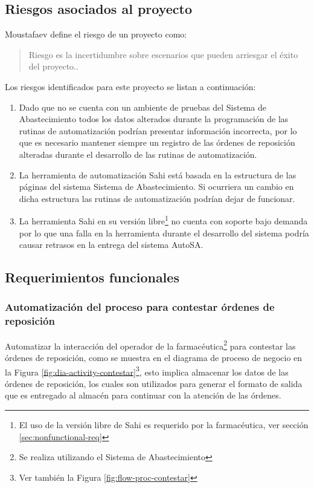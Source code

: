 \subsection{Riesgos asociados al proyecto}\label{sec-riesgos}
Moustafaev define el riesgo de un proyecto como:
\begin{quote}
Riesgo es la incertidumbre sobre escenarios que pueden arriesgar el éxito del proyecto.\cite{ScopeManagement}.
\end{quote}
Los riesgos identificados para este proyecto se listan a continuación:
\begin{enumerate}
  \item Dado que no se cuenta con un ambiente de pruebas del Sistema de Abastecimiento todos los datos alterados durante la programación de las rutinas de automatización podrían presentar información incorrecta, por lo que es necesario mantener siempre un registro de las órdenes de reposición alteradas durante el desarrollo de las rutinas de automatización.
  \item La herramienta de automatización Sahi está basada en la estructura de las páginas del sistema Sistema de Abastecimiento. Si ocurriera un cambio en dicha estructura las rutinas de automatización podrían dejar de funcionar.
  \item La herramienta Sahi en su versión libre\footnote{El uso de la versión libre de Sahi es requerido por la farmacéutica, ver sección \ref{sec:nonfunctional-req}} no cuenta con soporte bajo demanda por lo que una falla en la herramienta durante el desarrollo del sistema podría causar retrasos en la entrega del sistema AutoSA.
\end{enumerate}


\subsection{Requerimientos funcionales}
\subsubsection{Automatización del proceso para contestar órdenes de reposición}
Automatizar la interacción del operador de la farmacéutica\footnote{Se realiza utilizando el Sistema de Abastecimiento} para contestar las órdenes de reposición, como se muestra en el diagrama de proceso de negocio en la Figura \ref{fig:dia-activity-contestar}\footnote{Ver también la Figura \ref{fig:flow-proc-contestar}}, esto implica almacenar los datos de las órdenes de reposición, los cuales son utilizados para generar el formato de salida que es entregado al almacén para continuar con la atención de las órdenes.

